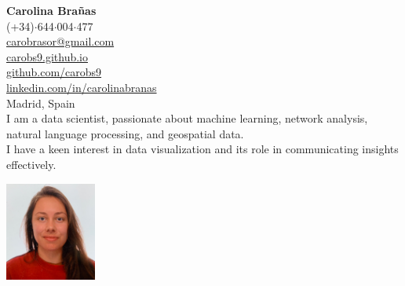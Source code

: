 \documentclass{resume}
\begin{document}
\vspace{-2em}
\begin{minipage}{0.75\textwidth}
    \raggedright
    {\Huge \textbf{Carolina Brañas}}\\[0.5em] 
    {\small
    (+34)$\cdot$644$\cdot$004$\cdot$477 \\
    \href{mailto://carobrasor@gmail.com}{carobrasor@gmail.com} \\
    \href{https://carobs9.github.io/}{carobs9.github.io} \\
    \href{https://github.com/carobs9}{github.com/carobs9} \\
    \href{https://www.linkedin.com/in/carolinabranas/}{linkedin.com/in/carolinabranas} \\
    Madrid, Spain
    }\\[1em]
    I am a data scientist, passionate about machine learning, network analysis, natural language processing, and geospatial data. \\
    I have a keen interest in data visualization and its role in communicating insights effectively.
\end{minipage}%
\hfill
\begin{minipage}{0.23\textwidth}
    \begin{flushright}
        \includegraphics[width=3cm]{profile.jpg}
    \end{flushright}
\end{minipage}
\vspace{1em}

\end{document}
